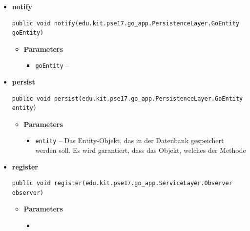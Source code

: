 \documentclass[11pt,a4paper]{report}
\begin{document}
{{{{{{{{{{{{{\begin{itemize}
{\begin{itemize}
{}%
\end{itemize}
}%
\item{ 
\hypertarget{edu.kit.pse17.go_app.PersistenceLayer.daos.GoDaoImp.notify(edu.kit.pse17.go_app.PersistenceLayer.GoEntity)}{{\bf  notify}\\}
\begin{lstlisting}[frame=none]
public void notify(edu.kit.pse17.go_app.PersistenceLayer.GoEntity goEntity)\end{lstlisting} %
\begin{itemize}
\item{
{\bf  Parameters}
  \begin{itemize}
   \item{
\texttt{goEntity} -- }
  \end{itemize}
}%
\end{itemize}
}%
\item{ 
\hypertarget{edu.kit.pse17.go_app.PersistenceLayer.daos.GoDaoImp.persist(edu.kit.pse17.go_app.PersistenceLayer.GoEntity)}{{\bf  persist}\\}
\begin{lstlisting}[frame=none]
public void persist(edu.kit.pse17.go_app.PersistenceLayer.GoEntity entity)\end{lstlisting} %
\begin{itemize}
\item{
{\bf  Parameters}
  \begin{itemize}
   \item{
\texttt{entity} -- Das Entity-Objekt, das in der Datenbank gespeichert werden soll. Es wird garantiert, dass das Objekt, welches der Methode}
  \end{itemize}
}%
\end{itemize}
}%
\item{ 
\hypertarget{edu.kit.pse17.go_app.PersistenceLayer.daos.GoDaoImp.register(edu.kit.pse17.go_app.ServiceLayer.Observer)}{{\bf  register}\\}
\begin{lstlisting}[frame=none]
public void register(edu.kit.pse17.go_app.ServiceLayer.Observer observer)\end{lstlisting} %
\begin{itemize}
\item{
{\bf  Parameters}
  \begin{itemize}
   \item{
}
\end{itemize}}
\end{itemize}}
\end{itemize}}}}}}}}}}}}}}
\end{document}
